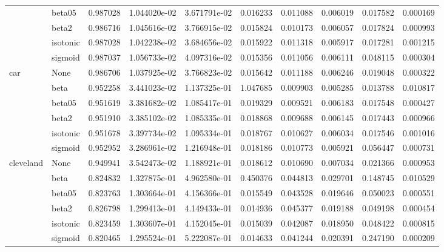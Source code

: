 \begin{tabular}{llrrrrrrrr}
        & beta05 &  0.987028 &  1.044020e-02 &  3.671791e-02 &   0.016233 &  0.011088 &  0.006019 &  0.017582 &  0.000169 \\
        & beta2 &  0.986716 &  1.045616e-02 &  3.766915e-02 &   0.015824 &  0.010173 &  0.006057 &  0.017824 &  0.000993 \\
        & isotonic &  0.987028 &  1.042238e-02 &  3.684656e-02 &   0.015922 &  0.011318 &  0.005917 &  0.017281 &  0.001215 \\
        & sigmoid &  0.987037 &  1.056733e-02 &  4.097316e-02 &   0.015356 &  0.011056 &  0.006111 &  0.048115 &  0.000304 \\
car & None &  0.986706 &  1.037925e-02 &  3.766823e-02 &   0.015642 &  0.011188 &  0.006246 &  0.019048 &  0.000322 \\
        & beta &  0.952258 &  3.441023e-02 &  1.137325e-01 &   1.047685 &  0.009903 &  0.005285 &  0.013788 &  0.010817 \\
        & beta05 &  0.951619 &  3.381682e-02 &  1.085417e-01 &   0.019329 &  0.009521 &  0.006183 &  0.017548 &  0.000427 \\
        & beta2 &  0.951910 &  3.385102e-02 &  1.085335e-01 &   0.018868 &  0.009688 &  0.006145 &  0.017443 &  0.000966 \\
        & isotonic &  0.951678 &  3.397734e-02 &  1.095334e-01 &   0.018767 &  0.010627 &  0.006034 &  0.017546 &  0.001016 \\
        & sigmoid &  0.952952 &  3.286961e-02 &  1.216948e-01 &   0.018186 &  0.010773 &  0.005921 &  0.056447 &  0.000731 \\
cleveland & None &  0.949941 &  3.542473e-02 &  1.188921e-01 &   0.018612 &  0.010690 &  0.007034 &  0.021366 &  0.000953 \\
        & beta &  0.824832 &  1.327875e-01 &  4.962580e-01 &   0.450376 &  0.044813 &  0.029701 &  0.148745 &  0.010529 \\
        & beta05 &  0.823763 &  1.303664e-01 &  4.156366e-01 &   0.015549 &  0.043528 &  0.019646 &  0.050023 &  0.000551 \\
        & beta2 &  0.826798 &  1.299413e-01 &  4.149433e-01 &   0.014936 &  0.045377 &  0.019188 &  0.049198 &  0.000454 \\
        & isotonic &  0.823459 &  1.303607e-01 &  4.152045e-01 &   0.015039 &  0.042087 &  0.018950 &  0.048422 &  0.000815 \\
        & sigmoid &  0.820465 &  1.295524e-01 &  5.222087e-01 &   0.014633 &  0.041244 &  0.020391 &  0.247190 &  0.000209 \\

\end{tabular}
